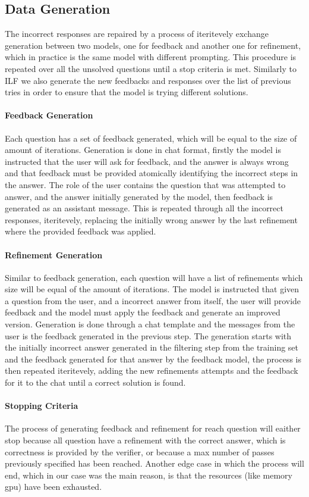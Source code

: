\documentclass[a4paper,10pt]{article}
\begin{document}
\subsection{Data Generation}
The incorrect responses are repaired by a process of iteritevely exchange generation between two models, one for feedback and another one for refinement, which in practice is the same model with different prompting. This procedure is repeated over all the unsolved questions until a stop criteria is met. Similarly to ILF we also generate the new feedbacks and responses over the list of previous tries in order to ensure that the model is trying different solutions.
\paragraph{Feedback Generation}
Each question has a set of feedback generated, which will be equal to the size of amount of iterations. Generation is done in chat format, firstly the model is instructed that the user will ask for feedback, and the answer is always wrong and that feedback must  be provided atomically identifying the incorrect steps in the answer. The role of the user contains the question that was attempted to answer, and the answer initially generated by the model, then feedback is generated as an assistant message. This is repeated through all the incorrect responses, iteritevely, replacing the initially wrong answer by the last refinement where the provided feedback was applied.
\paragraph{Refinement Generation}
Similar to feedback generation, each question will have a list of refinements which size will be equal of the amount of iterations. The model is instructed that given a question from the user, and a incorrect answer from itself, the user will provide feedback and the model must apply the feedback and generate an improved version. Generation is done through a chat template and the messages from the user is the feedback generated in the previous step. The generation starts with the initially incorrect answer generated in the filtering step from the training set and the feedback generated for that answer by the feedback model, the process is then repeated iteritevely, adding the new refinements  attempts and the feedback for it to the chat until a correct solution is found.
\paragraph{Stopping Criteria}
The process of generating feedback and refinement for reach question will eaither stop because all question have a refinement with the correct answer, which is correctness is provided by the verifier, or because a max number of passes previously specified has been reached. Another edge case in which the process will end, which in our case was the main reason, is that the resources (like memory gpu) have been exhausted.
\end{document}
